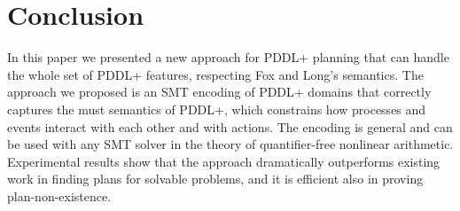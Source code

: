 \section{Conclusion}\label{sec:conclusion}

In this paper we presented a new approach for PDDL+ planning that can handle the whole set of PDDL+ features, respecting Fox and Long’s semantics.
The approach we proposed is an SMT encoding of PDDL+ domains that correctly captures the must semantics of PDDL+, which constrains how processes and events interact with each other and with actions. The encoding is general and can be used with any SMT solver in the theory of quantifier-free nonlinear arithmetic.
Experimental results show that the approach dramatically outperforms existing work in finding plans for solvable problems, and it is efficient also in proving plan-non-existence.

